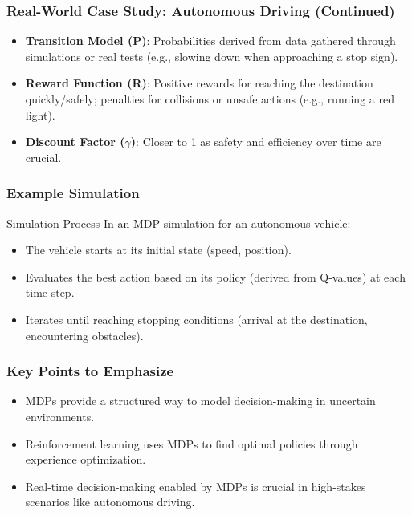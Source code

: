 \documentclass[aspectratio=169]{beamer}
\begin{document}
\begin{frame}[fragile]
    \frametitle{Real-World Case Study: Autonomous Driving (Continued)}
    \begin{itemize}
        \item \textbf{Transition Model (P)}: Probabilities derived from data gathered through simulations or real tests (e.g., slowing down when approaching a stop sign).
        \item \textbf{Reward Function (R)}: Positive rewards for reaching the destination quickly/safely; penalties for collisions or unsafe actions (e.g., running a red light).
        \item \textbf{Discount Factor ($\gamma$)}: Closer to 1 as safety and efficiency over time are crucial.
    \end{itemize}
\end{frame}

\begin{frame}[fragile]
    \frametitle{Example Simulation}
    \begin{block}{Simulation Process}
        In an MDP simulation for an autonomous vehicle:
        \begin{itemize}
            \item The vehicle starts at its initial state (speed, position).
            \item Evaluates the best action based on its policy (derived from Q-values) at each time step.
            \item Iterates until reaching stopping conditions (arrival at the destination, encountering obstacles).
        \end{itemize}
    \end{block}
\end{frame}

\begin{frame}[fragile]
    \frametitle{Key Points to Emphasize}
    \begin{itemize}
        \item MDPs provide a structured way to model decision-making in uncertain environments.
        \item Reinforcement learning uses MDPs to find optimal policies through experience optimization.
        \item Real-time decision-making enabled by MDPs is crucial in high-stakes scenarios like autonomous driving.
    \end{itemize}
\end{frame}
\end{document}
